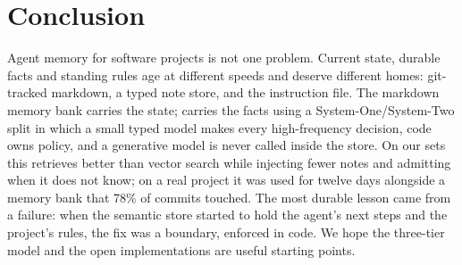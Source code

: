 \section{Conclusion}

Agent memory for software projects is not one problem. Current state, durable facts and standing rules age at different speeds and deserve different homes: git-tracked markdown, a typed note store, and the instruction file. The markdown memory bank carries the state; \jevmem{} carries the facts using a System-One/System-Two split in which a small typed model makes every high-frequency decision, code owns policy, and a generative model is never called inside the store. On our sets this retrieves better than vector search while injecting fewer notes and admitting when it does not know; on a real project it was used for twelve days alongside a memory bank that 78\% of commits touched. The most durable lesson came from a failure: when the semantic store started to hold the agent's next steps and the project's rules, the fix was a boundary, enforced in code. We hope the three-tier model and the open implementations are useful starting points.
